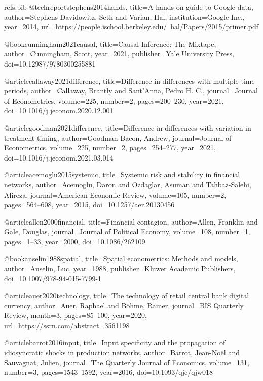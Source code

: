 \begin{filecontents}[overwrite]{refs.bib}
@techreport{stephens2014hands,
  title={A hands-on guide to Google data},
  author={Stephens-Davidowitz, Seth and Varian, Hal},
  institution={Google Inc.},
  year={2014},
  url={https://people.ischool.berkeley.edu/~hal/Papers/2015/primer.pdf}
}

@book{cunningham2021causal,
  title={Causal Inference: The Mixtape},
  author={Cunningham, Scott},
  year={2021},
  publisher={Yale University Press},
  doi={10.12987/9780300255881}
}

@article{callaway2021difference,
  title={Difference-in-differences with multiple time periods},
  author={Callaway, Brantly and Sant'Anna, Pedro H. C.},
  journal={Journal of Econometrics},
  volume={225},
  number={2},
  pages={200--230},
  year={2021},
  doi={10.1016/j.jeconom.2020.12.001}
}

@article{goodman2021difference,
  title={Difference-in-differences with variation in treatment timing},
  author={Goodman-Bacon, Andrew},
  journal={Journal of Econometrics},
  volume={225},
  number={2},
  pages={254--277},
  year={2021},
  doi={10.1016/j.jeconom.2021.03.014}
}

@article{acemoglu2015systemic,
  title={Systemic risk and stability in financial networks},
  author={Acemoglu, Daron and Ozdaglar, Asuman and Tahbaz-Salehi, Alireza},
  journal={American Economic Review},
  volume={105},
  number={2},
  pages={564--608},
  year={2015},
  doi={10.1257/aer.20130456}
}

@article{allen2000financial,
  title={Financial contagion},
  author={Allen, Franklin and Gale, Douglas},
  journal={Journal of Political Economy},
  volume={108},
  number={1},
  pages={1--33},
  year={2000},
  doi={10.1086/262109}
}

@book{anselin1988spatial,
  title={Spatial econometrics: Methods and models},
  author={Anselin, Luc},
  year={1988},
  publisher={Kluwer Academic Publishers},
  doi={10.1007/978-94-015-7799-1}
}

@article{auer2020technology,
  title={The technology of retail central bank digital currency},
  author={Auer, Raphael and B\"{o}hme, Rainer},
  journal={BIS Quarterly Review},
  month={3},
  pages={85--100},
  year={2020},
  url={https://ssrn.com/abstract=3561198}
}

@article{barrot2016input,
  title={Input specificity and the propagation of idiosyncratic shocks in production networks},
  author={Barrot, Jean-No\"{e}l and Sauvagnat, Julien},
  journal={The Quarterly Journal of Economics},
  volume={131},
  number={3},
  pages={1543--1592},
  year={2016},
  doi={10.1093/qje/qjw018}
}


\end{filecontents}
